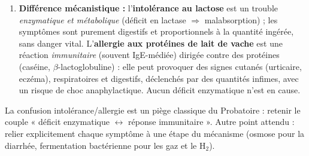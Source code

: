\documentclass[11pt]{article}
\begin{document}
\begin{corrige}
\begin{enumerate}
\begin{itemize}
        \item \textbf{Supplémentation en lactase exogène} (gouttes de lactase ajoutées au lait avant la tétée) : l'enzyme apportée réalise l'hydrolyse du lactose à la place de la lactase intestinale déficiente — c'est un traitement de substitution enzymatique.
    \end{itemize}
    \item \textbf{Différence mécanistique :} l'\textbf{intolérance au lactose} est un trouble \emph{enzymatique et métabolique} (déficit en lactase $\Rightarrow$ malabsorption) ; les symptômes sont purement digestifs et proportionnels à la quantité ingérée, sans danger vital. L'\textbf{allergie aux protéines de lait de vache} est une réaction \emph{immunitaire} (souvent IgE-médiée) dirigée contre des protéines (caséine, $\beta$-lactoglobuline) : elle peut provoquer des signes cutanés (urticaire, eczéma), respiratoires et digestifs, déclenchés par des quantités infimes, avec un risque de choc anaphylactique. Aucun déficit enzymatique n'est en cause.
\end{enumerate}
\end{corrige}

\begin{attention}
La confusion intolérance/allergie est un piège classique du Probatoire : retenir le couple « déficit enzymatique $\leftrightarrow$ réponse immunitaire ». Autre point attendu : relier explicitement chaque symptôme à une étape du mécanisme (osmose pour la diarrhée, fermentation bactérienne pour les gaz et le H$_2$).
\end{attention}
\end{document}
